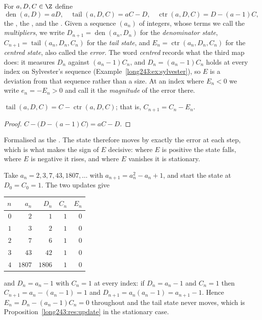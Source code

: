 \documentclass[11pt]{article}
\newcommand{\den}{\operatorname{den}}
\newcommand{\tail}{\operatorname{tail}}
\newcommand{\ctr}{\operatorname{ctr}}
\begin{document}
For $a,D,C\in\Z$ define
\[
 \den(a,D)=aD,
 \quad
 \tail(a,D,C)=aC-D,
 \quad
 \ctr(a,D,C)=D-(a-1)C ,
\]
the
, the
,
and the
.
Given a sequence $(a_n)$ of integers, whose terms we call the
\emph{multipliers}, we write $D_{n+1}=\den(a_n,D_n)$ for the \emph{denominator
state}, $C_{n+1}=\tail(a_n,D_n,C_n)$ for the \emph{tail state}, and
$E_n=\ctr(a_n,D_n,C_n)$ for the \emph{centred state}, also called the
\emph{error}.  The word \emph{centred} records what the third map does: it
measures $D_n$ against $(a_n-1)C_n$, and $D_n=(a_n-1)C_n$ holds at every index
on Sylvester's sequence (Example~\ref{long243:ex:sylvester}), so $E$ is a deviation
from that sequence rather than a size.  At an index where $E_n<0$ we write
$e_n=-E_n>0$ and call it the \emph{magnitude} of the error there.

\begin{proposition}\label{long243:res:update}
$\tail(a,D,C)=C-\ctr(a,D,C)$; that is, $C_{n+1}=C_n-E_n$.
\end{proposition}

\begin{proof}
$C-\bigl(D-(a-1)C\bigr)=aC-D$.
\end{proof}

\noindent Formalised as the
.  The state therefore moves by exactly the error at each step, which is
what makes the sign of $E$ decisive: where $E$ is positive the state falls,
where $E$ is negative it rises, and where $E$ vanishes it is stationary.

\begin{example}\label{long243:ex:sylvester}
Take $a_n=2,3,7,43,1807,\ldots$ with $a_{n+1}=a_n^{2}-a_n+1$, and start the
state at $D_0=C_0=1$.  The two updates give

\begin{center}
\begin{tabular}{@{}rrrrr@{}}
\toprule
$n$ & $a_n$ & $D_n$ & $C_n$ & $E_n$\\
\midrule
$0$ & $2$ & $1$ & $1$ & $0$\\
$1$ & $3$ & $2$ & $1$ & $0$\\
$2$ & $7$ & $6$ & $1$ & $0$\\
$3$ & $43$ & $42$ & $1$ & $0$\\
$4$ & $1807$ & $1806$ & $1$ & $0$\\
\bottomrule
\end{tabular}
\end{center}

\noindent and $D_n=a_n-1$ with $C_n=1$ at every index: if $D_n=a_n-1$ and
$C_n=1$ then $C_{n+1}=a_n-(a_n-1)=1$ and $D_{n+1}=a_n(a_n-1)=a_{n+1}-1$.
Hence $E_n=D_n-(a_n-1)C_n=0$ throughout and the tail state never moves, which
is Proposition~\ref{long243:res:update} in the stationary case.
\end{example}
\end{document}

